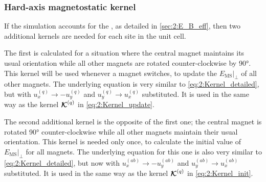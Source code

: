 \subsubsection{Hard-axis magnetostatic kernel}\label{sec:2:Kernels:Perp}
If the simulation accounts for the , as detailed in \cref{sec:2:E_B_eff}, then two additional kernels are needed for each site in the unit cell. \par
The first is calculated for a situation where the central magnet maintains its usual orientation while all other magnets are rotated counter-clockwise by \ang{90}.
This kernel will be used whenever a magnet switches, to update the  $\left. E_{\mathrm{MS}} \right|_{\perp}$ of all other magnets.
The underlying equation is very similar to \cref{eq:2:Kernel_detailed}, but with $u_x^{(q)} \rightarrow -u_y^{(q)}$ and $u_y^{(q)} \rightarrow u_x^{(q)}$ substituted.
It is used in the same way as the kernel $\boldsymbol{\mathbf{\mathcal{K}}}^{(q)}$ in \cref{eq:2:Kernel_update}. \par
The second additional kernel is the opposite of the first one; the central magnet is rotated \ang{90} counter-clockwise while all other magnets maintain their usual orientation.
This kernel is needed only once, to calculate the initial value of $\left. E_{\mathrm{MS}} \right|_{\perp}$ for all magnets.
The underlying equation for this one is also very similar to \cref{eq:2:Kernel_detailed}, but now with $u_x^{(ab)} \rightarrow -u_y^{(ab)}$ and $u_y^{(ab)} \rightarrow u_x^{(ab)}$ substituted.
It is used in the same way as the kernel $\boldsymbol{\mathbf{\mathcal{K}}}^{(q)}$ in \cref{eq:2:Kernel_init}.

